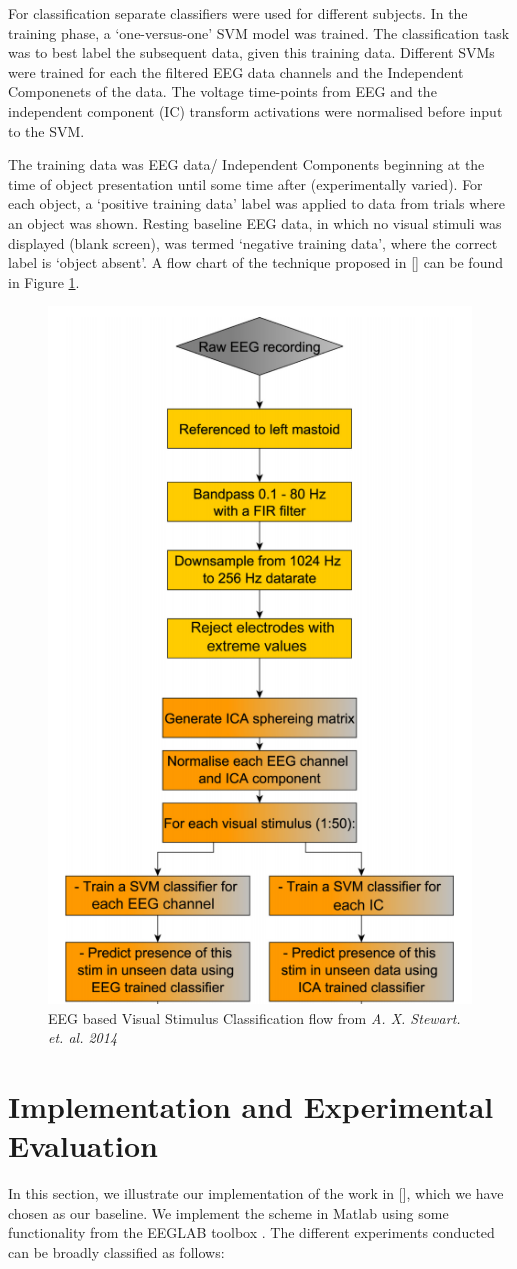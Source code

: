 \documentclass{article} %
\begin{document}
For classification separate classifiers were used for different subjects. In the training phase, a ‘one-versus-one’ SVM model was trained. The classification task was to best label the subsequent data, given this training data. Different SVMs were trained for each the filtered EEG data channels and the Independent Componenets of the data. The voltage time-points from EEG and the independent component (IC) transform activations were normalised before input to the SVM. 

The training data was EEG data/ Independent Components beginning at the time of object presentation until some time after (experimentally varied). For each object, a ‘positive training data’ label was applied to data from trials where an object was shown. Resting baseline EEG data, in which no visual stimuli was displayed (blank screen), was termed ‘negative training data’, where the correct label is ‘object absent’. A flow chart of the technique proposed in [] can be found in Figure \ref{fig:flowchart}.

\begin{figure}
	\centering
	\includegraphics[width=0.5\columnwidth]{flowchart}
	\caption{EEG based Visual Stimulus Classification flow from \textit{A. X. Stewart. et. al. 2014}}
	\label{fig:flowchart}
\end{figure}

\section{Implementation and Experimental Evaluation}
In this section, we illustrate our implementation of the work in [], which we have chosen as our baseline. We implement the scheme in Matlab using some functionality from the EEGLAB toolbox \cite{eeglab}. The different experiments conducted can be broadly classified as follows:
\end{document}
